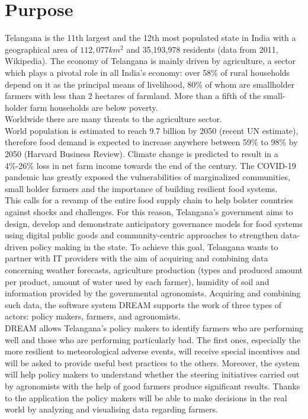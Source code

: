 \section{Purpose}

Telangana is the 11th largest and the 12th most populated state in India with a geographical area of $112,077 km^2$ and 35,193,978 residents (data from 2011, Wikipedia).
The economy of Telangana is mainly driven by agriculture, a sector which plays a pivotal role in all India’s economy: over 58\% of rural households depend on it as the principal means of livelihood, 80\% of whom are smallholder farmers with less than 2 hectares of farmland. More than a fifth of the small-holder farm households are below poverty. \\

Worldwide there are many threats to the agriculture sector.\\ World population is estimated to reach 9.7 billion by 2050 (recent UN estimate), therefore food demand is expected to increase anywhere between 59\% to 98\% by 2050 (Harvard Business Review). Climate change is predicted to result in a 4\%-26\% loss in net farm income towards the end of the century. The COVID-19 pandemic has greatly exposed the vulnerabilities of marginalized communities, small holder farmers and the importance of building resilient food systems.\\

This calls for a revamp of the entire food supply chain to help bolster countries against shocks and challenges. For this reason, Telangana’s government aims to design, develop and demonstrate anticipatory governance models for food systems using digital public goods and community-centric approaches to strengthen data-driven policy making in the state. To achieve this goal, Telangana wants to partner with IT providers with the aim of acquiring and combining data concerning weather forecasts, agriculture production (types and produced amount per product, amount of water used by each farmer), humidity of soil and information provided by the governmental agronomists. Acquiring and combining such data, the software system DREAM supports the work of three types of actors: policy makers, farmers, and agronomists.\\

DREAM allows Telangana’s policy makers to identify farmers who are performing well and those who are performing particularly bad. The first ones, especially the more resilient to meteorological adverse events, will receive special incentives and will be asked to provide useful best practices to the others. Moreover, the system will help policy makers to understand whether the steering initiatives carried out by agronomists with the help of good farmers produce significant results.
Thanks to the application the policy makers will be able to make decisions in the real world by analyzing and visualising data regarding farmers.\\

